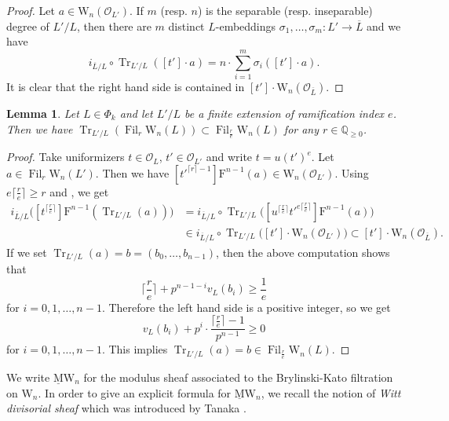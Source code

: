 \documentclass{amsart}
\theoremstyle{plain}
\newtheorem{lemma}[theorem]{Lemma}
\theoremstyle{definition}
\theoremstyle{remark}
\numberwithin{equation}{section}
\DeclareMathOperator{\Fil}{Fil}
\DeclareMathOperator{\Tr}{Tr}
\def\ceil#1{\lceil #1 \rceil}
\def\MW{\underline{\mathrm{M}}\mathrm{W}}
\begin{document}
\begin{proof}
	Let $a\in \mathrm{W}_n(\mathcal{O}_{L'})$.
	If $m$ (resp. $n$) is the separable (resp. inseparable) degree of $L'/L$, then there are $m$ distinct $L$-embeddings $\sigma_1,\dots,\sigma_m\colon L'\to \overline{L}$ and we have
	$$
		i_{\overline{L}/L}\circ \Tr_{L'/L}([t']\cdot a)=n\cdot \sum_{i=1}^m\sigma_i([t']\cdot a).
	$$
	It is clear that the right hand side is contained in $[t']\cdot \mathrm{W}_n(\mathcal{O}_{\overline{L}})$.
\end{proof}

\begin{lemma}\label{Witt_trace_axiom}
	Let $L\in \Phi_k$ and let $L'/L$ be a finite extension of ramification index $e$.
	Then we have $\Tr_{L'/L}(\Fil_r \mathrm{W}_n(L))\subset \Fil_{\frac{r}{e}}\mathrm{W}_n(L)$ for any $r\in \mathbb{Q}_{\geq 0}$.
\end{lemma}

\begin{proof}
	Take uniformizers $t\in \mathcal{O}_L$, $t'\in \mathcal{O}_{L'}$ and write $t=u(t')^e$.
	Let $a\in \Fil_r \mathrm{W}_n(L')$.
	Then we have $[t'^{\ceil{r}-1}]\mathrm{F}^{n-1}(a)\in \mathrm{W}_n(\mathcal{O}_{L'})$.
	Using $e\ceil{\frac{r}{e}}\geq r$ and , we get
	\begin{align*}
		i_{\overline{L}/L}\bigl([t^{\ceil{\frac{r}{e}}}]\mathrm{F}^{n-1}(\Tr_{L'/L}(a))\bigr)
		&=i_{\overline{L}/L}\circ\Tr_{L'/L}\bigl([u^{\ceil{\frac{r}{e}}}t'^{e\ceil{\frac{r}{e}}}]\mathrm{F}^{n-1}(a)\bigr)\\
		&\in i_{\overline{L}/L}\circ \Tr_{L'/L}\bigl([t']\cdot \mathrm{W}_n(\mathcal{O}_{L'})\bigl)
		\subset [t']\cdot \mathrm{W}_n(\mathcal{O}_{\overline{L}}).
	\end{align*}
	If we set $\Tr_{L'/L}(a)=b=(b_0,\dots,b_{n-1})$, then the above computation shows that
	$$
		\biggl\lceil\frac{r}{e}\biggr\rceil+p^{n-1-i}v_L(b_i)\geq\dfrac{1}{e}
	$$
	for $i=0,1,\dots,n-1$.
	Therefore the left hand side is a positive integer, so we get
	$$
		v_L(b_i)+p^i\cdot\frac{\ceil{\frac{r}{e}}-1}{p^{n-1}}\geq 0
	$$
	for $i=0,1,\dots,n-1$.
	This implies $\Tr_{L'/L}(a)=b\in \Fil_{\frac{r}{e}}\mathrm{W}_n(L)$.
\end{proof}

We write $\MW_n$ for the modulus sheaf associated to the Brylinski-Kato filtration on $\mathrm{W}_n$.
In order to give an explicit formula for $\MW_n$, we recall the notion of \emph{Witt divisorial sheaf} which was introduced by Tanaka \cite{Tanaka_Witt}.
\end{document}
